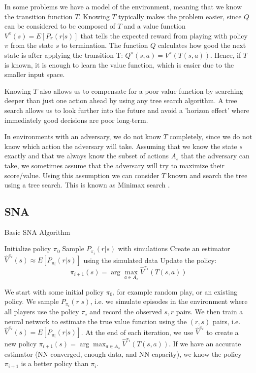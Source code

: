 \documentclass{article}
\begin{document}
In some problems we have a model of the environment, meaning that we know the transition function $T$.
Knowing $T$ typically makes the problem easier, since $Q$ can be considered to be composed of $T$ and a value function $V^{\pi}(s) = E[P_\pi(r|s)]$ that tells the expected reward from playing with policy $\pi$ from the state $s$ to termination. The function $Q$ calculates how good the next state is after applying the transition T: $Q^{\pi}(s,a) = V^{\pi}(T(s,a))$. Hence, if $T$ is known, it is enough to learn the value function, which is easier due to the smaller input space.

Knowing $T$ also allows us to compensate for a poor value function by searching deeper than just one action ahead by using any tree search algorithm. A tree search allows us to look further into the future and avoid a 'horizon effect' \cite{marsland1991computer} where immediately good decisions are poor long-term.

In environments with an adversary, we do not know $T$ completely, since we do not know which action the adversary will take. Assuming that we know the state $s$ exactly and that we always know the subset of actions $A_s$ that the adversary can take, we sometimes assume that the adversary will try to maximize their score/value. Using this assumption we can consider $T$ known and search the tree using a tree search. This is known as Minimax search \cite{kiefer1953sequential}.

\subsection{SNA}

\label{SNA}
\begin{algorithm}
\caption{Basic SNA Algorithm}
\label{alg:q-sna}
\begin{algorithmic}[1]
\State Initialize policy $\pi_0$
    \State Sample $P_{\pi_i}(r|s)$ with simulations
    \State Create an estimator $\hat{V}^{\pi_i}(s) \approx E[P_{\pi_i}(r|s)]$ using the simulated data
    \State Update the policy:
    \State $$\pi_{i+1}(s) =  \arg\!\max_{a \in A_s} \hat{V}^{\pi_i}(T(s,a))$$
\EndFor
\end{algorithmic}
\end{algorithm}
We start with some initial policy $\pi_0$, for example random play, or an existing policy. We sample $P_{\pi_i}(r|s)$, i.e. we simulate episodes in the environment where all players use the policy $\pi_i$ and record the observed $s,r$ pairs.
We then train a neural network to estimate the true value function using the $(r,s)$ pairs, i.e. $\hat{V}^{\pi_i}(s) = E[P_{\pi_i}(r|s)]$.
At the end of each iteration, we use $\hat{V}^{\pi_i}$ to create a new policy $\pi_{i+1}(s) = \arg\!\max_{a \in A_s} \hat{V}^{\pi_i}(T(s,a))$.
If we have an accurate estimator (NN converged, enough data, and NN capacity), we know the policy $\pi_{i+1}$ is a better policy than $\pi_{i}$.
\end{document}
